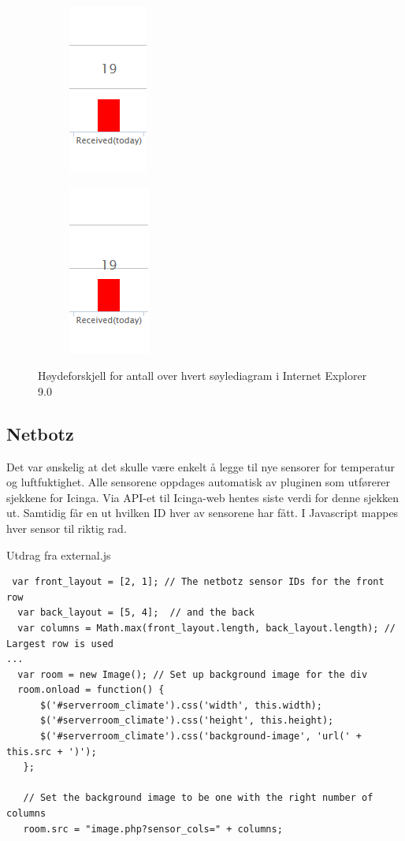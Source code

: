 \begin{figure}[H]
\centering
\begin{subfigure}
  \centering
  \includegraphics[scale=0.7]{img/IE_footprints_bug}
\end{subfigure}
\begin{subfigure}
  \centering
  \includegraphics[scale=0.7]{img/IE_footprints_fix}
\end{subfigure}
\caption{Høydeforskjell for antall over hvert søylediagram i Internet Explorer 9.0}
\label{IE_bug}
\end{figure}



\subsection{Netbotz}

Det var ønskelig at det skulle være enkelt å legge til nye sensorer for temperatur og luftfuktighet. Alle sensorene oppdages automatisk av pluginen som utførerer sjekkene for Icinga. Via API-et til Icinga-web hentes siste verdi for denne sjekken ut. Samtidig får en ut hvilken ID hver av sensorene har fått. I Javascript mappes hver sensor til riktig rad.

Utdrag fra external.js
\begin{lstlisting}
 var front_layout = [2, 1]; // The netbotz sensor IDs for the front row
  var back_layout = [5, 4];  // and the back
  var columns = Math.max(front_layout.length, back_layout.length); // Largest row is used 
...
  var room = new Image(); // Set up background image for the div
  room.onload = function() {
      $('#serverroom_climate').css('width', this.width);
      $('#serverroom_climate').css('height', this.height);
      $('#serverroom_climate').css('background-image', 'url(' + this.src + ')');
   };

   // Set the background image to be one with the right number of columns
   room.src = "image.php?sensor_cols=" + columns;
\end{lstlisting}

